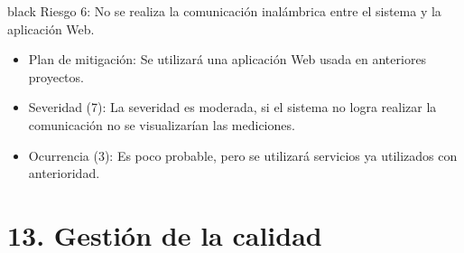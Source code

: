 \documentclass[11pt]{charter}
\begin{document}
\begin{consigna}{black}
Riesgo 6: No se realiza la comunicación inalámbrica entre el sistema y la aplicación Web.
\begin{itemize}
\item Plan de mitigación: Se utilizará una aplicación Web usada en anteriores proyectos. 
\item Severidad (7): La severidad es moderada, si el sistema no logra realizar la comunicación no se visualizarían las mediciones.
\item Ocurrencia (3): Es poco probable, pero se utilizará servicios ya utilizados con anterioridad.
\end{itemize}

\end{consigna}


\section{13. Gestión de la calidad}
\label{sec:calidad}
\vspace{-30px}
\end{document}
